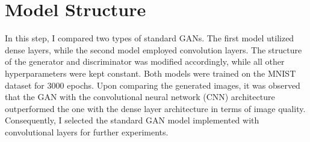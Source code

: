 \section{Model Structure}

In this step, I compared two types of standard GANs. The first model utilized dense layers, while the 
second model employed convolution layers. The structure of the generator and discriminator was modified 
accordingly, while all other hyperparameters were kept constant. Both models were trained on the MNIST 
dataset for 3000 epochs. Upon comparing the generated images, it was observed that the GAN with the convolutional 
neural network (CNN) architecture outperformed the one with the dense layer architecture in terms of image quality. 
Consequently, I selected the standard GAN model implemented with convolutional layers for further experiments.


